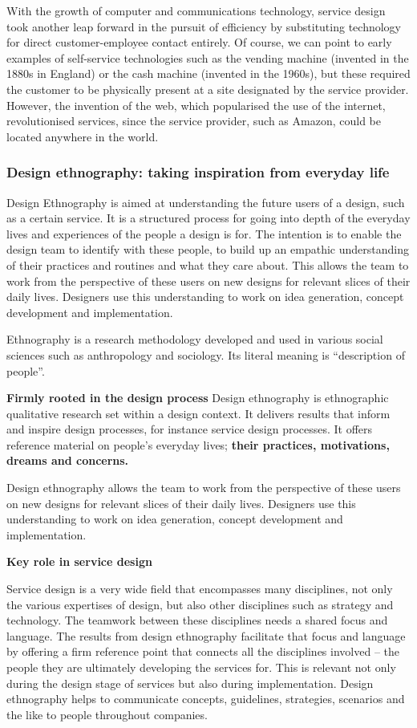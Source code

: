 With the growth of computer and communications technology, service design took another leap forward in the pursuit of efficiency by substituting technology for direct customer-employee contact entirely. Of course, we can point to early examples of self-service technologies such as the vending machine (invented in the 1880s in England) or the cash machine (invented in the 1960s), but these required the customer to be physically present at a site designated by the service provider. However, the invention of the web, which popularised the use of the internet, revolutionised services, since the service provider, such as Amazon, could be located anywhere in the world.

\subsubsection{Design ethnography: taking inspiration from everyday life}
Design Ethnography is aimed at understanding the future users of a design, such as a certain service. It is a structured process for going into depth of the everyday lives and experiences of the people a design is for. The intention is to enable the design team to identify with these people, to build up an empathic understanding of their practices and routines and what they care about. This allows the team to work from the perspective of these users on new designs for relevant slices of their daily lives. Designers use this understanding to work on idea generation, concept development and implementation.

Ethnography is a research methodology developed and used in various social sciences such as anthropology and sociology. Its literal meaning is “description of people”.

\textbf{Firmly rooted in the design process}
Design ethnography is ethnographic qualitative research set within a design context. It delivers results that inform and inspire design processes, for instance service design processes. It offers reference material on people’s everyday lives; \textbf{their practices, motivations, dreams and concerns.}

Design ethnography allows the team to work from the perspective of these users on new designs for relevant slices of their daily lives. Designers use this understanding to work on idea generation, concept development and implementation.

\textbf{Key role in service design}

Service design is a very wide field that encompasses many disciplines, not only the various expertises of design, but also other disciplines such as strategy and technology. The teamwork between these disciplines needs a shared focus and language. The results from design ethnography facilitate that focus and language by offering a firm reference point that connects all the disciplines involved – the people they are ultimately developing the services for. This is relevant not only during the design stage of services but also during implementation. Design ethnography helps to communicate concepts, guidelines, strategies, scenarios and the like to people throughout companies.


